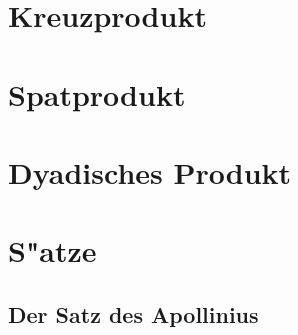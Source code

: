 \section{Kreuzprodukt}
\section{Spatprodukt}
\section{Dyadisches Produkt}
\section{S"atze}

\subsection{Der Satz des Apollinius}
